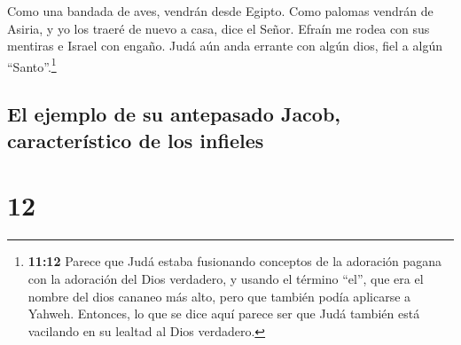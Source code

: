  Como una bandada de aves, vendrán desde Egipto. Como
palomas vendrán de Asiria, y yo los traeré de nuevo a casa, dice el
Señor.  Efraín me rodea con sus mentiras e Israel con
engaño. Judá aún anda errante con algún dios, fiel a algún
``Santo''.\footnote{\textbf{11:12} Parece que Judá estaba fusionando
  conceptos de la adoración pagana con la adoración del Dios verdadero,
  y usando el término ``el'', que era el nombre del dios cananeo más
  alto, pero que también podía aplicarse a Yahweh. Entonces, lo que se
  dice aquí parece ser que Judá también está vacilando en su lealtad al
  Dios verdadero.}

\hypertarget{el-ejemplo-de-su-antepasado-jacob-caracteruxedstico-de-los-infieles}{%
\subsection{El ejemplo de su antepasado Jacob, característico de los
infieles}\label{el-ejemplo-de-su-antepasado-jacob-caracteruxedstico-de-los-infieles}}

\hypertarget{section-11}{%
\section{12}\label{section-11}}

